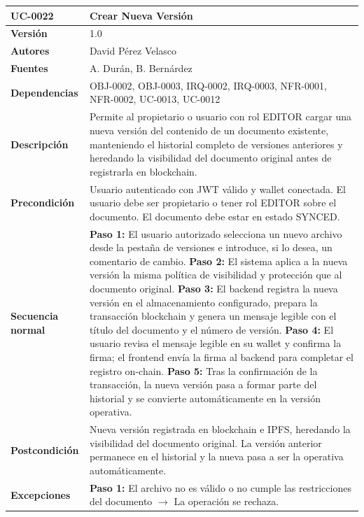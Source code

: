 \documentclass[11pt, a4paper]{article}
\begin{document}
\begin{longtable}{|p{4cm}|p{10cm}|}
\hline
\textbf{UC-0022} & Crear Nueva Versión \\
\hline
\textbf{Versión} & 1.0 \\
\hline
\textbf{Autores} & David Pérez Velasco \\
\hline
\textbf{Fuentes} & A. Durán, B. Bernárdez \\
\hline
\textbf{Dependencias} & OBJ-0002, OBJ-0003, IRQ-0002, IRQ-0003, NFR-0001, NFR-0002, UC-0013, UC-0012 \\
\hline
\textbf{Descripción} & Permite al propietario o usuario con rol EDITOR cargar una nueva versión del contenido de un documento existente, manteniendo el historial completo de versiones anteriores y heredando la visibilidad del documento original antes de registrarla en blockchain. \\
\hline
\textbf{Precondición} & Usuario autenticado con JWT válido y wallet conectada. El usuario debe ser propietario o tener rol EDITOR sobre el documento. El documento debe estar en estado SYNCED. \\
\hline
\textbf{Secuencia normal} &
\textbf{Paso 1:} El usuario autorizado selecciona un nuevo archivo desde la pestaña de versiones e introduce, si lo desea, un comentario de cambio.\newline
\textbf{Paso 2:} El sistema aplica a la nueva versión la misma política de visibilidad y protección que al documento original.\newline
\textbf{Paso 3:} El backend registra la nueva versión en el almacenamiento configurado, prepara la transacción blockchain y genera un mensaje legible con el título del documento y el número de versión.\newline
\textbf{Paso 4:} El usuario revisa el mensaje legible en su wallet y confirma la firma; el frontend envía la firma al backend para completar el registro on-chain.\newline
\textbf{Paso 5:} Tras la confirmación de la transacción, la nueva versión pasa a formar parte del historial y se convierte automáticamente en la versión operativa.\\
\hline
\textbf{Postcondición} & Nueva versión registrada en blockchain e IPFS, heredando la visibilidad del documento original. La versión anterior permanece en el historial y la nueva pasa a ser la operativa automáticamente. \\
\hline
\textbf{Excepciones} &
\textbf{Paso 1:} El archivo no es válido o no cumple las restricciones del documento $\rightarrow$ La operación se rechaza.\newline

\end{longtable}
\end{document}
